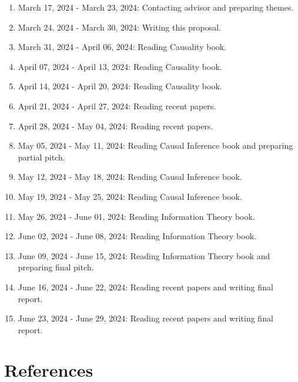\documentclass{article}
\begin{document}
\begin{enumerate}
\item March 17, 2024 - March 23, 2024: Contacting advisor and preparing themes.
\item March 24, 2024 - March 30, 2024: Writing this proposal.
\item March 31, 2024 - April 06, 2024: Reading Causality book\cite{Causality}.
\item April 07, 2024 - April 13, 2024: Reading Causality book\cite{Causality}.
\item April 14, 2024 - April 20, 2024: Reading Causality book\cite{Causality}.
\item April 21, 2024 - April 27, 2024: Reading recent papers.
\item April 28, 2024 - May   04, 2024: Reading recent papers.
\item May   05, 2024 - May   11, 2024: Reading Causal Inference book\cite{CausalInf} and preparing partial pitch.
\item May   12, 2024 - May   18, 2024: Reading Causal Inference book\cite{CausalInf}.
\item May   19, 2024 - May   25, 2024: Reading Causal Inference book\cite{CausalInf}.
\item May   26, 2024 - June  01, 2024: Reading Information Theory book\cite{InfoTheory}.
\item June  02, 2024 - June  08, 2024: Reading Information Theory book\cite{InfoTheory}.
\item June  09, 2024 - June  15, 2024: Reading Information Theory book\cite{InfoTheory} and preparing final pitch.
\item June  16, 2024 - June  22, 2024: Reading recent papers and writing final report.
\item June  23, 2024 - June  29, 2024: Reading recent papers and writing final report.
\end{enumerate}


\section{References}



\end{document}
